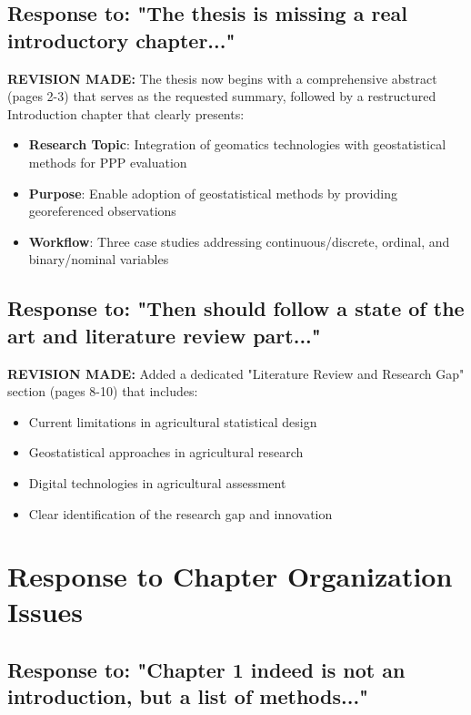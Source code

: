\documentclass[11pt,a4paper]{article}
\begin{document}
\subsection{Response to: "The thesis is missing a real introductory chapter..."}

\textbf{REVISION MADE:} The thesis now begins with a comprehensive abstract (pages 2-3) that serves as the requested summary, followed by a restructured Introduction chapter that clearly presents:

\begin{itemize}
\item \textbf{Research Topic}: Integration of geomatics technologies with geostatistical methods for PPP evaluation
\item \textbf{Purpose}: Enable adoption of geostatistical methods by providing georeferenced observations
\item \textbf{Workflow}: Three case studies addressing continuous/discrete, ordinal, and binary/nominal variables
\end{itemize}

\subsection{Response to: "Then should follow a state of the art and literature review part..."}

\textbf{REVISION MADE:} Added a dedicated "Literature Review and Research Gap" section (pages 8-10) that includes:
\begin{itemize}
\item Current limitations in agricultural statistical design
\item Geostatistical approaches in agricultural research
\item Digital technologies in agricultural assessment
\item Clear identification of the research gap and innovation
\end{itemize}

\section{Response to Chapter Organization Issues}

\subsection{Response to: "Chapter 1 indeed is not an introduction, but a list of methods..."}
\end{document}
